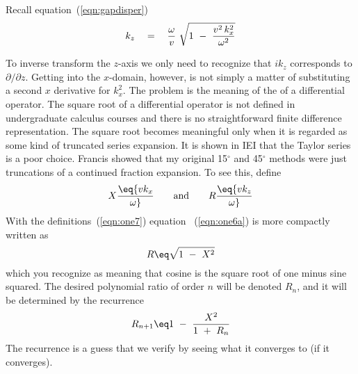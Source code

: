 Recall equation~(\ref{eqn:gapdisper})
\begin{equation}
k_z \ \  \ =\  \ \  {\omega \over v }\   \sqrt { 1 \  - \  { v^2 \, k_x^2 
\over \omega^2 }}
\label{eqn:one6a}
\end{equation}
\par
To inverse transform the  $z$-axis we
only need to recognize that  $ i k_z $  corresponds
to  $ \partial / \partial z $.
Getting into the $x$-domain, however,
is not simply a matter of substituting
a second  $x$  derivative for  $k_x^2$.
The problem is the meaning of the  of a differential operator.
The square root of a differential operator is not defined in
undergraduate calculus courses and there is no straightforward
finite difference representation.
The square root becomes meaningful only when it is regarded
as some kind of truncated series expansion.
It is shown in
IEI that the Taylor series is a poor choice.
Francis  showed that my original 15$^\circ$ and 45$^\circ$ methods were
just truncations of a continued fraction expansion.
To see this, define
\begin{equation}
        X \eq {v k_x \over\omega}
        \quad\quad {\rm and} \quad\quad
        R \eq {v k_z \over\omega}
        \label{eqn:one7}
\end{equation}
With the definitions~(\ref{eqn:one7})
equation ~(\ref{eqn:one6a}) is more compactly written as
\begin{equation}
        R \eq  \sqrt { 1 \  - \  X^2 }
\label{eqn:abstract}
\end{equation}
which you recognize as meaning that cosine
is the square root of one minus sine squared.
The desired polynomial ratio of order  $n$  will be
denoted  $ R_n $,  and
it will be determined by the recurrence
\begin{equation}
R_{n+1}  \eq  1 \ -\  { X^2   \over  1 \ +\  R_n }
\label{eqn:one8}
\end{equation}
The recurrence is a guess
that we verify by seeing what it converges to (if it converges).

